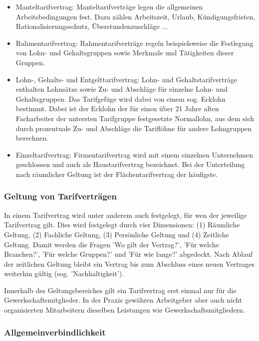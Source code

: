 	\begin{itemize}
		\item Manteltarifvertrag: Manteltarifverträge legen die allgemeinen Arbeitsbedingungen fest. Dazu zählen Arbeitszeit, Urlaub, Kündigungsfristen, Rationalisierungsschutz, Überstundenzuschläge ...
		\item Rahmentarifvertrag: Rahmentarifverträge regeln beispielsweise die Festlegung von Lohn- und Gehaltsgruppen sowie Merkmale und Tätigkeiten dieser Gruppen.
		\item Lohn-, Gehalts- und Entgelttarifvertrag: Lohn- und Gehaltstarifverträge enthalten Lohnsätze sowie Zu- und Abschläge für einzelne Lohn- und Gehaltsgruppen. Das Tarifgefüge wird dabei von einem sog. Ecklohn bestimmt. Dabei ist der Ecklohn der für einen über 21 Jahre alten Facharbeiter der untersten Tarifgruppe festgesetzte Normallohn, aus dem sich durch prozentuale Zu- und Abschläge die Tariflöhne für andere Lohngruppen berechnen.
		\item Einzeltarifvertrag: Firmentarifvertrag wird mit einem einzelnen Unternehmen geschlossen und auch als Haustarifvertrag bezeichnet. Bei der Unterteilung nach räumlicher Geltung ist der Flächentarifvertrag der häufigste. 
	\end{itemize}

\subsubsection{Geltung von Tarifverträgen}

In einem Tarifvertrag wird unter anderem auch festgelegt, für wen der jeweilige Tarifvertrag gilt. Dies wird festgelegt durch vier Dimensionen: (1) Räumliche Geltung, (2) Fachliche Geltung, (3) Persönliche Geltung und (4) Zeitliche Geltung. Damit werden die Fragen 'Wo gilt der Vertrag?', 'Für welche Branchen?', 'Für welche Gruppen?' und 'Für wie lange?' abgedeckt. Nach Ablauf der zeitlichen Geltung bleibt ein Vertrag bis zum Abschluss eines neuen Vertrages weiterhin gültig (sog. 'Nachhaltigkeit').

Innerhalb des Geltungsbereiches gilt ein Tarifvertrag erst einmal nur für die Gewerkschaftsmitglieder. In der Praxis gewähren Arbeitgeber aber auch nicht organisierten Mitarbeitern dieselben Leistungen wie Gewerkschaftsmitgliedern. 

\subsubsection{Allgemeinverbindlichkeit}

